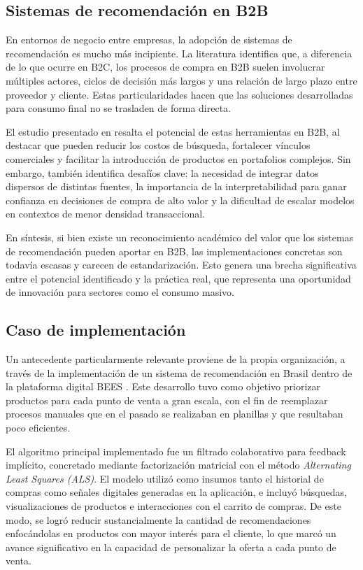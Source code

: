 \subsection{Sistemas de recomendación en B2B}

En entornos de negocio entre empresas, la adopción de sistemas de recomendación es mucho más incipiente. La literatura identifica que, a diferencia de lo que ocurre en B2C, los procesos de compra en B2B suelen involucrar múltiples actores, ciclos de decisión más largos y una relación de largo plazo entre proveedor y cliente. Estas particularidades hacen que las soluciones desarrolladas para consumo final no se trasladen de forma directa.

El estudio presentado en \cite{ARTICLE:1} resalta el potencial de estas herramientas en B2B, al destacar que pueden reducir los costos de búsqueda, fortalecer vínculos comerciales y facilitar la introducción de productos en portafolios complejos. Sin embargo, también identifica desafíos clave: la necesidad de integrar datos dispersos de distintas fuentes, la importancia de la interpretabilidad para ganar confianza en decisiones de compra de alto valor y la dificultad de escalar modelos en contextos de menor densidad transaccional.

En síntesis, si bien existe un reconocimiento académico del valor que los sistemas de recomendación pueden aportar en B2B, las implementaciones concretas son todavía escasas y carecen de estandarización. Esto genera una brecha significativa entre el potencial identificado y la práctica real, que representa una oportunidad de innovación para sectores como el consumo masivo.

\subsection{Caso de implementación}

Un antecedente particularmente relevante proviene de la propia organización, a través de la implementación de un sistema de recomendación en Brasil dentro de la plataforma digital BEES \cite{REPORT:1}. Este desarrollo tuvo como objetivo priorizar productos para cada punto de venta a gran escala, con el fin de reemplazar procesos manuales que en el pasado se realizaban en planillas y que resultaban poco eficientes.

El algoritmo principal implementado fue un filtrado colaborativo para feedback implícito, concretado mediante factorización matricial con el método \textit{Alternating Least Squares (ALS)}. El modelo utilizó como insumos tanto el historial de compras como señales digitales generadas en la aplicación, e incluyó búsquedas, visualizaciones de productos e interacciones con el carrito de compras. De este modo, se logró reducir sustancialmente la cantidad de recomendaciones enfocándolas en productos con mayor interés para el cliente, lo que marcó un avance significativo en la capacidad de personalizar la oferta a cada punto de venta.

